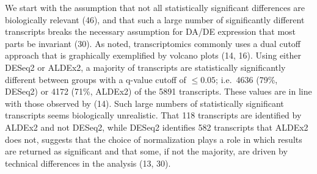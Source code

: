 \documentclass[
]{article}
\begin{document}
We start with the assumption that not all statistically significant
differences are biologically relevant (46), and that such a large number
of significantly different transcripts breaks the necessary assumption
for DA/DE expression that most parts be invariant (30). As noted,
transcriptomics commonly uses a dual cutoff approach that is graphically
exemplified by volcano plots (14, 16). Using either DESeq2 or ALDEx2, a
majority of transcripts are statistically significantly different
between groups with a q-value cutoff of \(\le 0.05\); i.e.~4636 (79\%,
DESeq2) or 4172 (71\%, ALDEx2) of the 5891 transcripts. These values are
in line with those observed by (14). Such large numbers of statistically
significant transcripts seems biologically unrealistic. That 118
transcripts are identified by ALDEx2 and not DESeq2, while DESeq2
identifies 582 transcripts that ALDEx2 does not, suggests that the
choice of normalization plays a role in which results are returned as
significant and that some, if not the majority, are driven by technical
differences in the analysis (13, 30).
\end{document}
